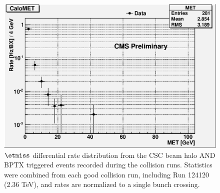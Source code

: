 \begin{figure}[htp]
\begin{center}
\includegraphics[scale=0.75]{plots_BeamHalo/CaloMET.eps}
\end{center}
\caption{$\etmiss$ differential rate distribution from the CSC beam halo AND BPTX triggered events recorded during the collision runs. Statistics were combined from each good collision run, including Run 124120 (2.36 TeV), and rates are normalized to a single bunch crossing.   }
\label{fig:BH_CaloMET}
\end{figure}

